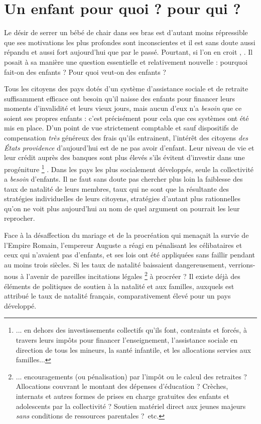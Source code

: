   

 \chapter{Un enfant pour quoi ? pour qui ?}


Le désir de serrer un bébé de chair dans ses bras est d'autant moins répressible que ses motivations les plus profondes sont inconscientes et il est sans doute aussi répandu et aussi fort aujourd'hui que par le passé. Pourtant, si l'on en croit , . Il posait à sa manière une question essentielle et relativement nouvelle : pourquoi fait-on des enfants ? Pour quoi veut-on des enfants ?


 
 Tous les citoyens des pays dotés d'un système d'assistance sociale et de retraite suffisamment efficace ont besoin qu'il naisse des enfants pour financer leurs moments d'invalidité et leurs vieux jours, mais aucun d'eux n'a \emph{besoin} que ce soient ses propres enfants : c'est précisément pour cela que ces systèmes ont été mis en place. D'un point de vue strictement comptable et sauf dispositifs de compensation \emph{très}  généreux des frais qu'ils entrainent, l'intérêt des citoyens \emph{des États providence} d'aujourd'hui est de ne pas avoir d'enfant. Leur niveau de vie et leur crédit auprès des banques sont plus élevés s'ils évitent d'investir dans une progéniture
\footnote{... en dehors des investissements collectifs qu'ils font, contraints et forcés, à travers leurs impôts pour financer l'enseignement, l'assistance sociale en direction de tous les mineurs, la santé infantile, et les allocations servies aux familles...} 
. Dans les pays les plus socialement développés, seule la collectivité a \emph{besoin} d'enfants. Il ne faut sans doute pas chercher plus loin la faiblesse des taux de natalité de leurs membres, taux qui ne sont que la résultante des stratégies individuelles de leurs citoyens, stratégies d'autant plus rationnelles qu'on ne voit plus aujourd'hui au nom de quel argument on pourrait les leur reprocher. 
 
 Face à la désaffection du mariage et de la procréation qui menaçait la survie de l'Empire Romain, l'empereur Auguste a réagi en pénalisant les célibataires et ceux qui n'avaient pas d'enfants, et ses lois ont été appliquées sans faillir pendant au moins trois siècles. Si les taux de natalité baissaient dangereusement, verrions-nous à l'avenir de pareilles incitations légales
\footnote{... encouragements (ou pénalisation) par l'impôt ou le calcul des retraites ? Allocations couvrant le montant des dépenses d'éducation ? Crèches, internats et autres formes de prises en charge gratuites des enfants et adolescents par la collectivité ? Soutien matériel direct aux jeunes majeurs \emph{sans} conditions de ressources parentales ?~etc.} 
à procréer ? Il existe déjà des éléments de politiques de soutien à la natalité et aux familles, auxquels est attribué le taux de natalité français, comparativement élevé pour un pays développé.
 
